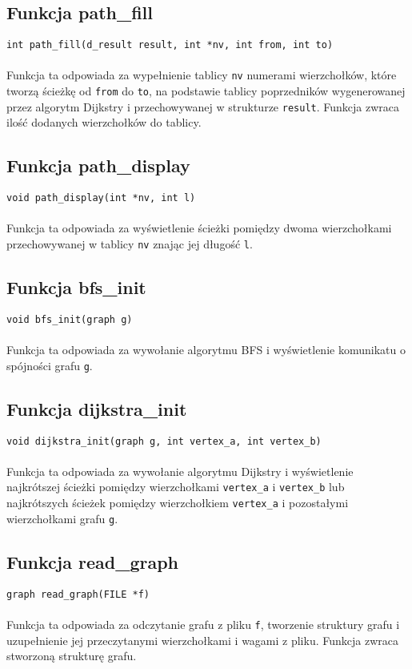 \documentclass[11pt,a4paper]{report}
\begin{document}
    \subsection{Funkcja path\_fill}
    \verb|int path_fill(d_result result, int *nv, int from, int to)|\\
    \\
    Funkcja ta odpowiada za wypełnienie tablicy \verb|nv| numerami wierzchołków, które tworzą ścieżkę od \verb|from| do \verb|to|, na podstawie tablicy poprzedników wygenerowanej przez algorytm Dijkstry i przechowywanej w strukturze \verb|result|. Funkcja zwraca ilość dodanych wierzchołków do tablicy.\\
    \subsection{Funkcja path\_display}
    \verb|void path_display(int *nv, int l)|\\
    \\
    Funkcja ta odpowiada za wyświetlenie ścieżki pomiędzy dwoma wierzchołkami przechowywanej w tablicy \verb|nv| znając jej długość \verb|l|.\\
    \subsection{Funkcja bfs\_init}
    \verb|void bfs_init(graph g)|\\
    \\
    Funkcja ta odpowiada za wywołanie algorytmu BFS i wyświetlenie komunikatu o spójności grafu \verb|g|.\\
    \subsection{Funkcja dijkstra\_init}
    \verb|void dijkstra_init(graph g, int vertex_a, int vertex_b)|\\
    \\
    Funkcja ta odpowiada za wywołanie algorytmu Dijkstry i wyświetlenie najkrótszej ścieżki pomiędzy wierzchołkami \verb|vertex_a| i \verb|vertex_b| lub najkrótszych ścieżek pomiędzy wierzchołkiem \verb|vertex_a| i pozostałymi wierzchołkami grafu \verb|g|.\\
    \subsection{Funkcja read\_graph}
    \verb|graph read_graph(FILE *f)|\\
    \\
    Funkcja ta odpowiada za odczytanie grafu z pliku \verb|f|, tworzenie struktury grafu i uzupełnienie jej przeczytanymi wierzchołkami i wagami z pliku. Funkcja zwraca stworzoną strukturę grafu.\\
\end{document}
